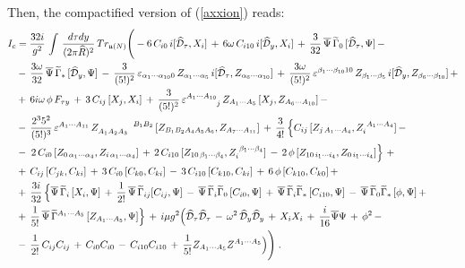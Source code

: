 \documentclass[a4paper,11pt]{article}
\begin{document}
Then, the compactified version of (\ref{axxion}) reads:
\begin{align} \label{eq:comp}
I_c &= \frac{32i}{g^2}\,\int\,\frac{d\tau dy}{(2\pi \widehat{R})^2} 
\,Tr_{\frak{u}(N)}\Bigg( -6\,C_{i0}\,i[\mathcal{\widehat{D}}_{\tau},X_i]\,
+\,6\omega\, C_{i10}\,i[\mathcal{\widehat{D}}_{y},X_i]\,
+\, \frac{3}{32}\,\overline{\Psi}\,\widetilde{\Gamma}_{0}\,[\mathcal{\widehat{D}}_{\tau},\Psi]\,-\nonumber\\ 
&-\, \frac{3 \omega}{32}\,\overline{\Psi}\,\widetilde{\Gamma}_{*}\,[\mathcal{\widehat{D}}_y,\Psi]\,
-\,\frac{3}{(5!)^2}\,\varepsilon_{\alpha_1\cdots \alpha_{10}0}\,
Z_{\alpha_1\cdots \alpha_5}\, i[\mathcal{\widehat{D}}_{\tau},Z_{\alpha_6\cdots \alpha_{10}}]\,
+\,\frac{3\omega}{(5!)^2}\,\varepsilon^{\beta_1\cdots \beta_{10}10}\,
Z_{\beta_1\cdots \beta_5}\, i[\mathcal{\widehat{D}}_{y},Z_{\beta_6 \cdots \beta_{10}}]\,+\nonumber\\
&+\,6i\omega\, \phi \, F_{\tau y}\, +\,3\,C_{ij}\,[X_j,X_i]\,
+\, \frac{3}{(5!)^2}\,\varepsilon^{A_1\cdots A_{10}}_{\phantom{A_1\cdots A_{10}}j}\, 
Z_{A_1\cdots A_5}\,[X_j,Z_{A_6\cdots A_{10}}]\,-\nonumber \\
&-\,\frac{2^3 5^2}{(5!)^3}\,\varepsilon^{A_1\cdots A_{11}}\, Z_{A_1 A_2
A_3}^{\phantom{M_1 M_2 M_3}B_1 B_2}\,[Z_{B_1 B_2 A_4 A_5 A_6}, Z_{A_7\cdots
A_{11}}] \,+\, \frac{3}{4!}\left\{ C_{ij}\,[Z_{j\, A_1 \cdots A_4}, Z_{i}^{
\phantom{i} A_1\cdots A_4}]\,-\, \right.  \nonumber \\
&-\, \left. 2\,C_{i0}\,[Z_{0 \,\alpha_1\cdots \alpha_4}, Z_{i\,\alpha_1
\cdots \alpha_4}]\,+\, 2\,C_{i10}\,[Z_{10\, \beta_1\cdots \beta_{4}}, Z_{i}^{
\phantom{i} \beta_1\cdots \beta_{4}}] \,-\,2\,\phi\,[Z_{10\, i_1\cdots
i_{4}},Z_{0\, i_1\cdots i_{4}}]\right\}\,+\,  \nonumber \\
&+\,C_{ij}\,[C_{jk},C_{ki}]\,+\,3\,C_{i0}\,[C_{k0},C_{ki}]\,-\,3\,C_{i10}
\,[C_{k 10},C_{ki}] \,+\, 6\,\phi\,[C_{k10},C_{k0}]\,+\,  \\
&+\,\frac{3i}{32}\,\Big\{ \overline{\Psi}\,\widetilde{\Gamma}
_{i}\,[X_{i},\Psi] \,+\, \frac{1}{2!}\,\overline{\Psi}\,
\widetilde{\Gamma}_{ij}[C_{ij},\Psi]\,-\, \overline{\Psi}\,
\widetilde{\Gamma}_{i}\widetilde{\Gamma}_{0}\,[C_{i0},\Psi]\,+\, \overline{\Psi}\,
\widetilde{\Gamma}_i\widetilde{\Gamma}_{*}\,[C_{i10},\Psi]\,
-\,\overline{\Psi}\,\widetilde{\Gamma}_{0}\widetilde{\Gamma}_{*}\,[\phi,\Psi]\,+\nonumber\\
&+\,\frac{1}{5!}\, \overline{\Psi}\,\widetilde{\Gamma}^{A_1\cdots
A_5}\,[Z_{A_1\cdots A_5},\Psi]\Big\}\,+
\,i\mu g^2 \Big(\mathcal{\widehat{D}}_{\tau}\mathcal{\widehat{D}}_{\tau}\,
-\, \omega^2 \,\mathcal{\widehat{D}}_y\mathcal{\widehat{D}}_y\,
+\,X_{i}X_{i}\,+\,\frac{i}{16}\overline{\Psi }\Psi \,+\,\phi ^{2}\,-\nonumber\\
&-\,\frac{1}{2!}\,C_{ij}C_{ij}\,+\,C_{i0}C_{i0}\,-
\,C_{i10}C_{i10}\,+\,\frac{1}{5!}Z_{A_{1}\cdots A_{5}}Z^{A_{1}\cdots A_{5}}
\Big)
\Bigg)\;.\notag
\end{align}
\end{document}
